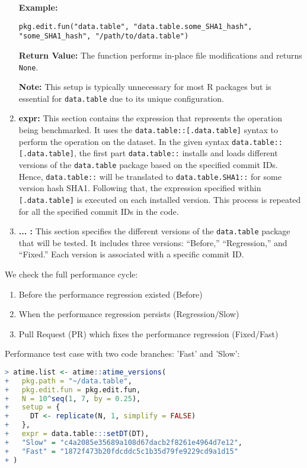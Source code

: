 \begin{enumerate}
\textbf{Example:}
\begin{verbatim}
pkg.edit.fun("data.table", "data.table.some_SHA1_hash", "some_SHA1_hash", "/path/to/data.table")
\end{verbatim}

\textbf{Return Value:} The function performs in-place file modifications and returns \texttt{None}.

\textbf{Note:} This setup is typically unnecessary for most R packages but is essential for \texttt{data.table} due to its unique configuration.

       
\item \textbf{expr:} This section contains the expression that represents the operation being benchmarked. It uses the \texttt{data.table::[.data.table]} syntax to perform the operation on the dataset. In the given syntax \texttt{data.table::[.data.table]}, the first part \texttt{data.table::} installs and loads different versions of the \texttt{data.table} package based on the specified commit IDs. Hence, \texttt{data.table::} will be translated to \texttt{data.table.SHA1::} for some version hash SHA1. Following that, the expression specified within \texttt{[.data.table]} is executed on each installed version. This process is repeated for all the specified commit IDs in the code.
 
    \item \textbf{... :} This section specifies the different versions of the \texttt{data.table} package that will be tested. It includes three versions: ``Before,'' ``Regression,'' and ``Fixed.'' Each version is associated with a specific commit ID.
\end{enumerate}

We check the full performance cycle:

\begin{enumerate}
    \item Before the performance regression existed (Before)
    \item When the performance regression persists (Regression/Slow)
    \item Pull Request (PR) which fixes the performance regression (Fixed/Fast)
\end{enumerate}

\noindent Performance test case with two code branches: 'Fast' and 'Slow':\\

\begin{lstlisting}[language=R]
> atime.list <- atime::atime_versions(
+   pkg.path = "~/data.table",
+   pkg.edit.fun = pkg.edit.fun,
+   N = 10^seq(1, 7, by = 0.25),
+   setup = { 
+     DT <- replicate(N, 1, simplify = FALSE)
+   },
+   expr = data.table:::setDT(DT),
+   "Slow" = "c4a2085e35689a108d67dacb2f8261e4964d7e12",
+   "Fast" = "1872f473b20fdcddc5c1b35d79fe9229cd9a1d15"
+ )
\end{lstlisting}

